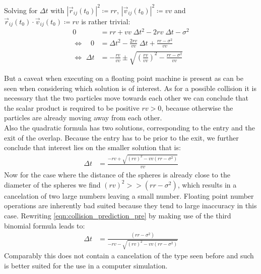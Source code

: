 Solving for $\Delta t$ with $|\vec{r}_{ij}(t_0)|^2 \coloneqq rr $, $|\vec{v}_{ij}(t_0)|^2 \coloneqq vv $ and  $\vec{r}_{ij}(t_0) \cdot \vec{v}_{ij}(t_0) \coloneqq rv $ is rather trivial:
\begin{align}
0 &= rr + vv \; \Delta t ^2  - 2 rv \; \Delta t  -\sigma^2\\
\Leftrightarrow \quad 0 &= \Delta t ^2 - \frac{2rv}{vv} \; \Delta t + \frac{rr - \sigma^2 }{vv}\\
\Leftrightarrow \, \, \Delta t &= - \frac{rv}{vv} \pm \sqrt{\left(\frac{rv}{vv}\right)^2 - \frac{rr - \sigma^2 }{vv}}
\end{align}

But a caveat when executing on a floating point machine is present as can be seen when considering which solution is of interest. As for a possible collision it is necessary that the two particles move towards each other we can conclude that the scalar product is required to be positive $rv>0$, because otherwise the particles are already moving away from each other.\\ 

Also the quadratic formula has two solutions, corresponding to the entry and the exit of the overlap. Because the entry has to be prior to the exit, we further conclude that interest lies on the smaller solution that is:
\begin{align}
\label{eqn:collision_prediction_pre}
\Delta t &= \frac{ - rv + \sqrt{ (rv)^2  - vv (rr - \sigma^2 )} }{vv}
\end{align}
Now for the case where the distance of the spheres is already close to the diameter of the spheres we find $(rv)^2 >> (rr-\sigma^2)$, which results in a cancelation of two large numbers leaving a small number. Floating point number operations are inherently bad suited because they tend to large inaccuracy in this case. Rewriting \autoref{eqn:collision_prediction_pre} by making use of the third binomial formula  leads to:
\begin{align}
\Delta t &= \frac{(rr - \sigma^2 )}{ - rv - \sqrt{ (rv)^2  - vv (rr - \sigma^2 )}}
\end{align}
Comparably this does not contain a cancelation of the type seen before and such is better suited for the use in a computer simulation. \\
\vspace{20ex}

